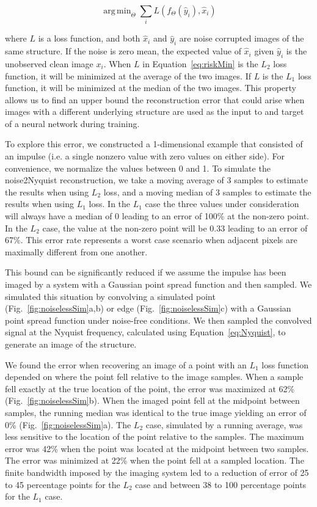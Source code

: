 \documentclass[journal,twoside,web]{ieeecolor}
\DeclareMathOperator*{\argmin}{arg\,min} %
\begin{document}
\begin{equation}
	\argmin_\Theta \sum_i L(f_\Theta(\hat{y}_i),\hat{x}_i)
    \label{eq:riskMin}	
\end{equation}

where $L$ is a loss function, and both $\hat{x}_i$ and $\hat{y}_i$ are noise corrupted images of the same structure. If the noise is zero mean, the expected value of $\hat{x}_i$ given $\hat{y}_i$ is the unobserved clean image $x_i$. When $L$ in Equation~\ref{eq:riskMin} is the $L_2$ loss function, it will be minimized at the average of the two images. If $L$ is the $L_1$ loss function, it will be minimized at the median of the two images. This property allows us to find an upper bound the reconstruction error that could arise when images with a different underlying structure are used as the input to and target of a neural network during training. 

To explore this error, we constructed a 1-dimensional example that consisted of an impulse (i.e. a single nonzero value with zero values on either side). For convenience, we normalize the values between 0 and 1. To simulate the noise2Nyquist reconstruction, we take a moving average of 3 samples to estimate the results when using $L_2$ loss, and a moving median of 3 samples to estimate the results when using $L_1$ loss. In the $L_1$ case the three values under consideration will always have a median of 0 leading to an error of 100\% at the non-zero point. In the $L_2$ case, the value at the non-zero point will be 0.33 leading to an error of 67\%. This error rate represents a worst case scenario when adjacent pixels are maximally different from one another. 

This bound can be significantly reduced if we assume the impulse has been imaged by a system with a Gaussian point spread function and then sampled. We simulated this situation by convolving a simulated point (Fig.~\ref{fig:noiselessSim}a,b) or edge (Fig.~\ref{fig:noiselessSim}c) with a Gaussian point spread function under noise-free conditions. We then sampled the convolved signal at the Nyquist frequency, calculated using Equation~\ref{eq:Nyquist}, to generate an image of the structure.

We found the error when recovering an image of a point with an $L_1$ loss function depended on where the point fell relative to the image samples. When a sample fell exactly at the true location of the point, the error was maximized at 62\% (Fig.~\ref{fig:noiselessSim}b). When the imaged point fell at the midpoint between samples, the running median was identical to the true image yielding an error of 0\% (Fig.~\ref{fig:noiselessSim}a). The $L_2$ case, simulated by a running average, was less sensitive to the location of the point relative to the samples. The maximum error was 42\% when the point was located at the midpoint between two samples. The error was minimized at 22\% when the point fell at a sampled location. The finite bandwidth imposed by the imaging system led to a reduction of error of 25 to 45 percentage points for the $L_2$ case and between 38 to 100 percentage points for the $L_1$ case. 
\end{document}
